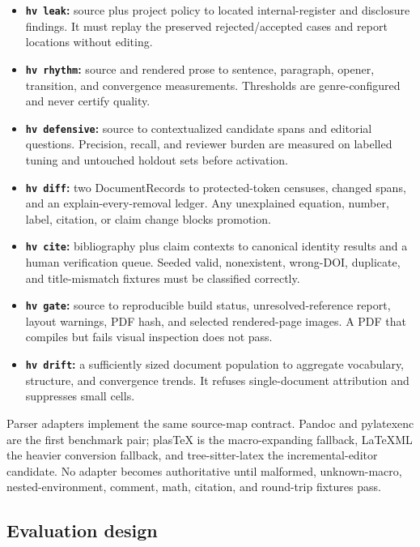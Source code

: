 \documentclass[11pt]{article}
\providecommand{\tightlist}{\setlength{\itemsep}{0pt}\setlength{\parskip}{0pt}}
\begin{document}
\begin{itemize}
\tightlist
\item
  \textbf{\texttt{hv\ leak}:} source plus project policy to located internal-register and disclosure findings. It must replay the preserved rejected/accepted cases and report locations without editing.
\item
  \textbf{\texttt{hv\ rhythm}:} source and rendered prose to sentence, paragraph, opener, transition, and convergence measurements. Thresholds are genre-configured and never certify quality.
\item
  \textbf{\texttt{hv\ defensive}:} source to contextualized candidate spans and editorial questions. Precision, recall, and reviewer burden are measured on labelled tuning and untouched holdout sets before activation.
\item
  \textbf{\texttt{hv\ diff}:} two DocumentRecords to protected-token censuses, changed spans, and an explain-every-removal ledger. Any unexplained equation, number, label, citation, or claim change blocks promotion.
\item
  \textbf{\texttt{hv\ cite}:} bibliography plus claim contexts to canonical identity results and a human verification queue. Seeded valid, nonexistent, wrong-DOI, duplicate, and title-mismatch fixtures must be classified correctly.
\item
  \textbf{\texttt{hv\ gate}:} source to reproducible build status, unresolved-reference report, layout warnings, PDF hash, and selected rendered-page images. A PDF that compiles but fails visual inspection does not pass.
\item
  \textbf{\texttt{hv\ drift}:} a sufficiently sized document population to aggregate vocabulary, structure, and convergence trends. It refuses single-document attribution and suppresses small cells.
\end{itemize}

Parser adapters implement the same source-map contract. Pandoc and pylatexenc are the first benchmark pair; plasTeX is the macro-expanding fallback, LaTeXML the heavier conversion fallback, and tree-sitter-latex the incremental-editor candidate. No adapter becomes authoritative until malformed, unknown-macro, nested-environment, comment, math, citation, and round-trip fixtures pass.

\hypertarget{evaluation-design}{%
\subsection{Evaluation design}\label{evaluation-design}}
\end{document}
